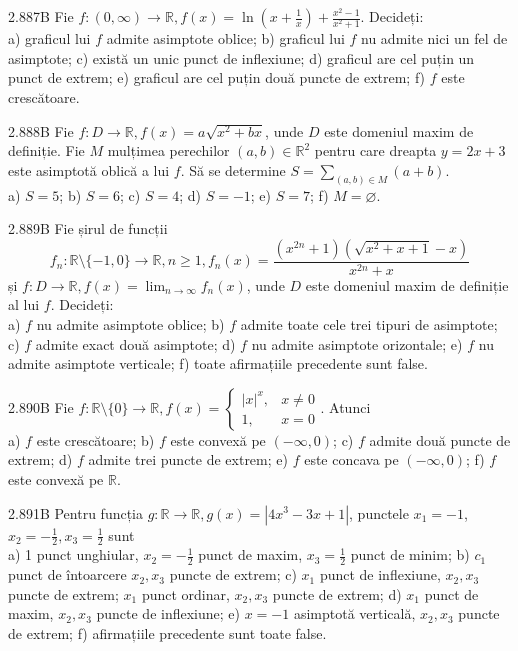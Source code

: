 \documentclass[11pt]{article}
\begin{document}
2.887B Fie $f:(0, \infty) \rightarrow \mathbb{R}, f(x)=\ln \left(x+\frac{1}{x}\right)+\frac{x^{2}-1}{x^{2}+1}$. Decideți:\\ a) graficul lui $f$ admite asimptote oblice; b) graficul lui $f$ nu admite nici un fel de asimptote; c) există un unic punct de inflexiune; d) graficul are cel puțin un punct de extrem; e) graficul are cel puțin două puncte de extrem; f) $f$ este crescătoare.

2.888B Fie $f: D \rightarrow \mathbb{R}, f(x)=a \sqrt{x^{2}+b x}$, unde $D$ este domeniul maxim de definiție. Fie $M$ mulțimea perechilor $(a, b) \in \mathbb{R}^{2}$ pentru care dreapta $y=2 x+3$ este asimptotă oblică a lui $f$. Să se determine $S=\sum_{(a, b) \in M}(a+b)$.\\ a) $S=5$; b) $S=6$; c) $S=4$; d) $S=-1$; e) $S=7$; f) $M=\varnothing$.

2.889B Fie șirul de funcții $$f_{n}: \mathbb{R} \setminus\{-1,0\} \rightarrow \mathbb{R}, n \geq 1, f_{n}(x)=\frac{\left(x^{2 n}+1\right)\left(\sqrt{x^{2}+x+1}-x\right)}{x^{2 n}+x}$$ și $f: D \rightarrow \mathbb{R}, f(x)=\lim _{n \rightarrow \infty} f_{n}(x)$, unde $D$ este domeniul maxim de definiție al lui $f$. Decideți:\\ a) $f$ nu admite asimptote oblice; b) $f$ admite toate cele trei tipuri de asimptote; c) $f$ admite exact două asimptote; d) $f$ nu admite asimptote orizontale; e) $f$ nu admite asimptote verticale; f) toate afirmațiile precedente sunt false.

2.890B Fie $f: \mathbb{R} \setminus\{0\} \rightarrow \mathbb{R}, f(x)=\left\{\begin{array}{ll}|x|^{x}, & x \neq 0 \\ 1, & x=0\end{array}\right.$. Atunci\\ a) $f$ este crescătoare; b) $f$ este convexă pe $(-\infty, 0)$; c) $f$ admite două puncte de extrem; d) $f$ admite trei puncte de extrem; e) $f$ este concava pe $(-\infty, 0)$; f) $f$ este convexă pe $\mathbb{R}$.

2.891B Pentru funcția $g: \mathbb{R} \rightarrow \mathbb{R}, g(x)=\left|4 x^{3}-3 x+1\right|$, punctele $x_{1}=-1$, $x_{2}=-\frac{1}{2}, x_{3}=\frac{1}{2}$ sunt\\ a) 1 punct unghiular, $x_{2}=-\frac{1}{2}$ punct de maxim, $x_{3}=\frac{1}{2}$ punct de minim; b) $c_{1}$ punct de întoarcere $x_{2}, x_{3}$ puncte de extrem; c) $x_{1}$ punct de inflexiune, $x_{2}, x_{3}$ puncte de extrem; $x_{1}$ punct ordinar, $x_{2}, x_{3}$ puncte de extrem; d) $x_{1}$ punct de maxim, $x_{2}, x_{3}$ puncte de inflexiune; e) $x=-1$ asimptotă verticală, $x_{2}, x_{3}$ puncte de extrem; f) afirmațiile precedente sunt toate false.
\end{document}
